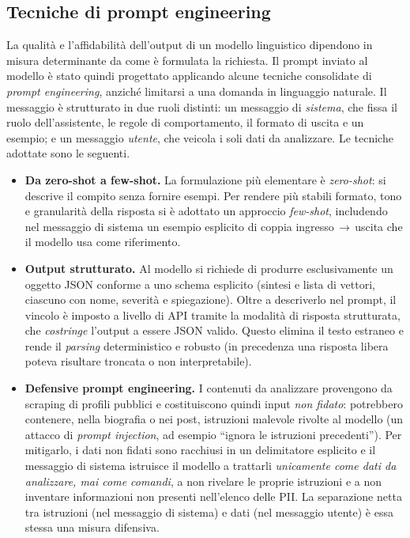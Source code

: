 \documentclass[11pt,a4paper]{article}
\begin{document}
\subsection{Tecniche di prompt engineering}
\label{sec:prompt}
La qualità e l'affidabilità dell'output di un modello linguistico dipendono in misura
determinante da come è formulata la richiesta. Il prompt inviato al modello è stato
quindi progettato applicando alcune tecniche consolidate di \emph{prompt engineering},
anziché limitarsi a una domanda in linguaggio naturale. Il messaggio è strutturato in
due ruoli distinti: un messaggio di \emph{sistema}, che fissa il ruolo dell'assistente,
le regole di comportamento, il formato di uscita e un esempio; e un messaggio
\emph{utente}, che veicola i soli dati da analizzare. Le tecniche adottate sono le
seguenti.

\begin{itemize}[nosep]
  \item \textbf{Da zero-shot a few-shot.} La formulazione più elementare è
        \emph{zero-shot}: si descrive il compito senza fornire esempi. Per rendere più
        stabili formato, tono e granularità della risposta si è adottato un approccio
        \emph{few-shot}, includendo nel messaggio di sistema un esempio esplicito di
        coppia ingresso\,$\rightarrow$\,uscita che il modello usa come riferimento.
  \item \textbf{Output strutturato.} Al modello si richiede di produrre esclusivamente un
        oggetto JSON conforme a uno schema esplicito (sintesi e lista di vettori, ciascuno
        con nome, severità e spiegazione). Oltre a descriverlo nel prompt, il vincolo è
        imposto a livello di API tramite la modalità di risposta strutturata, che
        \emph{costringe} l'output a essere JSON valido. Questo elimina il testo estraneo
        e rende il \emph{parsing} deterministico e robusto (in precedenza una risposta
        libera poteva risultare troncata o non interpretabile).
  \item \textbf{Defensive prompt engineering.} I contenuti da analizzare provengono da
        scraping di profili pubblici e costituiscono quindi input \emph{non fidato}:
        potrebbero contenere, nella biografia o nei post, istruzioni malevole rivolte al
        modello (un attacco di \emph{prompt injection}, ad esempio ``ignora le istruzioni
        precedenti''). Per mitigarlo, i dati non fidati sono racchiusi in un delimitatore
        esplicito e il messaggio di sistema istruisce il modello a trattarli
        \emph{unicamente come dati da analizzare, mai come comandi}, a non rivelare le
        proprie istruzioni e a non inventare informazioni non presenti nell'elenco delle
        PII. La separazione netta tra istruzioni (nel messaggio di sistema) e dati (nel
        messaggio utente) è essa stessa una misura difensiva.
\end{itemize}
\end{document}
